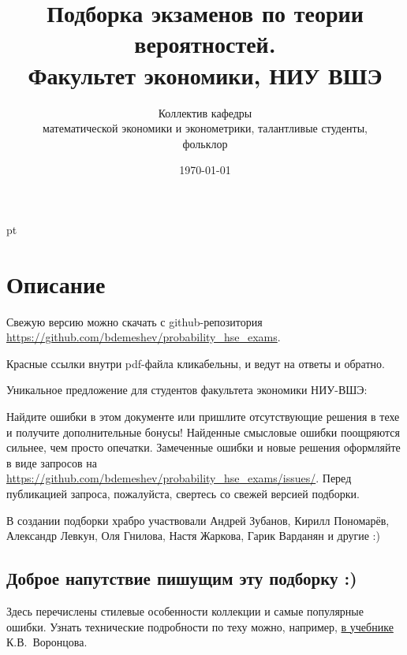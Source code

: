 \documentclass[12pt, a4paper]{article}
\title{Подборка экзаменов по теории вероятностей. \\Факультет экономики, НИУ ВШЭ}
\date{\today}
\author{Коллектив кафедры \\
математической экономики и эконометрики,
талантливые студенты,\\
 фольклор}
\begin{document}
\maketitle

\tableofcontents{}


 pt %

\section*{Описание}

Свежую версию можно скачать с github-репозитория \url{https://github.com/bdemeshev/probability_hse_exams}.

Красные ссылки внутри pdf-файла кликабельны, и ведут на ответы и обратно.


Уникальное предложение для студентов факультета экономики НИУ-ВШЭ:

Найдите ошибки в этом документе или пришлите отсутствующие решения в техе и получите дополнительные бонусы!
Найденные смысловые ошибки поощряются сильнее, чем просто опечатки.
Замеченные ошибки и новые решения оформляйте в виде запросов на
\url{https://github.com/bdemeshev/probability_hse_exams/issues/}.
Перед публикацией запроса, пожалуйста, свертесь со свежей версией подборки.

В создании подборки храбро участвовали
Андрей Зубанов, Кирилл Пономарёв, Александр Левкун, Оля Гнилова,
Настя Жаркова, Гарик Варданян и другие :)


\subsection*{Доброе напутствие пишущим эту подборку :)}

Здесь перечислены стилевые особенности коллекции и самые популярные ошибки.
Узнать технические подробности по теху можно, например, \href{http://www.ccas.ru/voron/download/voron05latex.pdf}{в учебнике} К.В. Воронцова.
\end{document}
